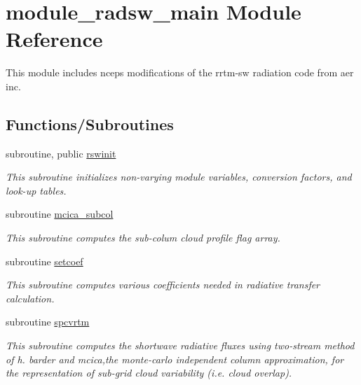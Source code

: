 \hypertarget{namespacemodule__radsw__main}{}\section{module\+\_\+radsw\+\_\+main Module Reference}
\label{namespacemodule__radsw__main}


This module includes ncep\textquotesingle{}s modifications of the rrtm-\/sw radiation code from aer inc.  


\subsection*{Functions/\+Subroutines}
\begin{DoxyCompactItemize}
\item 
subroutine, public \hyperlink{namespacemodule__radsw__main_afab73c508f778203d0f4b5181f1cbca9}{rswinit}                                                                                             
\begin{DoxyCompactList}\small\item\em This subroutine initializes non-\/varying module variables, conversion factors, and look-\/up tables. \end{DoxyCompactList}\item 
subroutine \hyperlink{namespacemodule__radsw__main_a97297a02cb1e23f2449918dfdacd9745}{mcica\+\_\+subcol}                                                                                   
\begin{DoxyCompactList}\small\item\em This subroutine computes the sub-\/colum cloud profile flag array. \end{DoxyCompactList}\item 
subroutine \hyperlink{namespacemodule__radsw__main_ab24dd3a4fae5749bf7ce09eebe6deb30}{setcoef}                                                                                             
\begin{DoxyCompactList}\small\item\em This subroutine computes various coefficients needed in radiative transfer calculation. \end{DoxyCompactList}\item 
subroutine \hyperlink{namespacemodule__radsw__main_a3f2a98a5eece3e3904d164adce213d7a}{spcvrtm}                                                                                             
\begin{DoxyCompactList}\small\item\em This subroutine computes the shortwave radiative fluxes using two-\/stream method of h. barder and mcica,the monte-\/carlo independent column approximation, for the representation of sub-\/grid cloud variability (i.\+e. cloud overlap). \end{DoxyCompactList}\item 

\end{DoxyCompactItemize}
